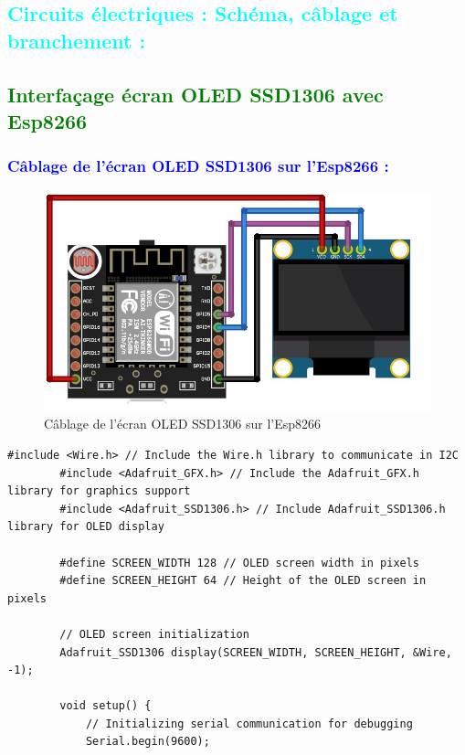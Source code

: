 \begin{flushleft}
	\section{\textcolor{cyan}{Circuits électriques : Schéma, câblage et branchement :}}
	
	\subsection{\textcolor{green}{Interfaçage écran OLED SSD1306 avec Esp8266}}
	\subsubsection{\textcolor{blue}{Câblage de l'écran OLED SSD1306 sur l'Esp8266 :}}

		\begin{figure}[h]
			\centering
			\includegraphics{chapitres/images/esp8266-oled1306.jpg}
			\caption{Câblage de l'écran OLED SSD1306 sur l'Esp8266}
			\label{fig:labelname}
		\end{figure}
	
	\begin{lstlisting}[style=CStyle]
		#include <Wire.h> // Include the Wire.h library to communicate in I2C
		#include <Adafruit_GFX.h> // Include the Adafruit_GFX.h library for graphics support
		#include <Adafruit_SSD1306.h> // Include Adafruit_SSD1306.h library for OLED display
		
		#define SCREEN_WIDTH 128 // OLED screen width in pixels
		#define SCREEN_HEIGHT 64 // Height of the OLED screen in pixels
		
		// OLED screen initialization
		Adafruit_SSD1306 display(SCREEN_WIDTH, SCREEN_HEIGHT, &Wire, -1);
		
		void setup() {
			// Initializing serial communication for debugging
			Serial.begin(9600);
			

\end{lstlisting}
\end{flushleft}

